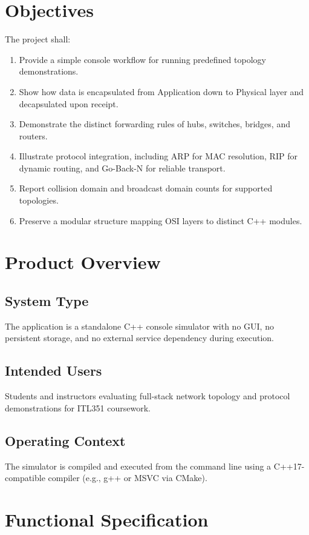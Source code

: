 \documentclass[12pt,a4paper]{article}
\begin{document}
\section{Objectives}
The project shall:
\begin{enumerate}
    \item Provide a simple console workflow for running predefined topology demonstrations.
    \item Show how data is encapsulated from Application down to Physical layer and decapsulated upon receipt.
    \item Demonstrate the distinct forwarding rules of hubs, switches, bridges, and routers.
    \item Illustrate protocol integration, including ARP for MAC resolution, RIP for dynamic routing, and Go-Back-N for reliable transport.
    \item Report collision domain and broadcast domain counts for supported topologies.
    \item Preserve a modular structure mapping OSI layers to distinct C++ modules.
\end{enumerate}

\section{Product Overview}
\subsection{System Type}
The application is a standalone C++ console simulator with no GUI, no persistent storage, and no external service dependency during execution.

\subsection{Intended Users}
Students and instructors evaluating full-stack network topology and protocol demonstrations for ITL351 coursework.

\subsection{Operating Context}
The simulator is compiled and executed from the command line using a C++17-compatible compiler (e.g., g++ or MSVC via CMake).

\section{Functional Specification}
\end{document}
